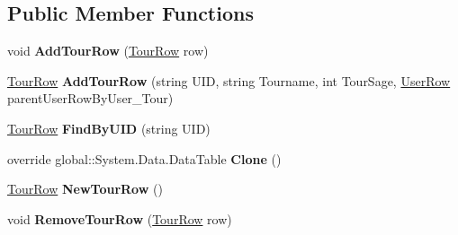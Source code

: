 \subsection*{Public Member Functions}
\begin{DoxyCompactItemize}
\item 
void {\bfseries Add\+Tour\+Row} (\hyperlink{class_products_1_1_data_1_1ds_sage_1_1_tour_row}{Tour\+Row} row)\hypertarget{class_products_1_1_data_1_1ds_sage_1_1_tour_data_table_a19591769346b2b368358c75e6055bd0f}{}\label{class_products_1_1_data_1_1ds_sage_1_1_tour_data_table_a19591769346b2b368358c75e6055bd0f}

\item 
\hyperlink{class_products_1_1_data_1_1ds_sage_1_1_tour_row}{Tour\+Row} {\bfseries Add\+Tour\+Row} (string U\+ID, string Tourname, int Tour\+Sage, \hyperlink{class_products_1_1_data_1_1ds_sage_1_1_user_row}{User\+Row} parent\+User\+Row\+By\+User\+\_\+\+Tour)\hypertarget{class_products_1_1_data_1_1ds_sage_1_1_tour_data_table_a7432287248348276e4197874ed523994}{}\label{class_products_1_1_data_1_1ds_sage_1_1_tour_data_table_a7432287248348276e4197874ed523994}

\item 
\hyperlink{class_products_1_1_data_1_1ds_sage_1_1_tour_row}{Tour\+Row} {\bfseries Find\+By\+U\+ID} (string U\+ID)\hypertarget{class_products_1_1_data_1_1ds_sage_1_1_tour_data_table_aec30e050326945bceffdfbed65bf0a77}{}\label{class_products_1_1_data_1_1ds_sage_1_1_tour_data_table_aec30e050326945bceffdfbed65bf0a77}

\item 
override global\+::\+System.\+Data.\+Data\+Table {\bfseries Clone} ()\hypertarget{class_products_1_1_data_1_1ds_sage_1_1_tour_data_table_a4b637ae76e7cc50eabe0aebcd8c9b501}{}\label{class_products_1_1_data_1_1ds_sage_1_1_tour_data_table_a4b637ae76e7cc50eabe0aebcd8c9b501}

\item 
\hyperlink{class_products_1_1_data_1_1ds_sage_1_1_tour_row}{Tour\+Row} {\bfseries New\+Tour\+Row} ()\hypertarget{class_products_1_1_data_1_1ds_sage_1_1_tour_data_table_acd151d05f9563ffee47f89f58acc5f63}{}\label{class_products_1_1_data_1_1ds_sage_1_1_tour_data_table_acd151d05f9563ffee47f89f58acc5f63}

\item 
void {\bfseries Remove\+Tour\+Row} (\hyperlink{class_products_1_1_data_1_1ds_sage_1_1_tour_row}{Tour\+Row} row)\hypertarget{class_products_1_1_data_1_1ds_sage_1_1_tour_data_table_a8f22ba022d06bf9a300a43e24f0d9c62}{}\label{class_products_1_1_data_1_1ds_sage_1_1_tour_data_table_a8f22ba022d06bf9a300a43e24f0d9c62}

\end{DoxyCompactItemize}
